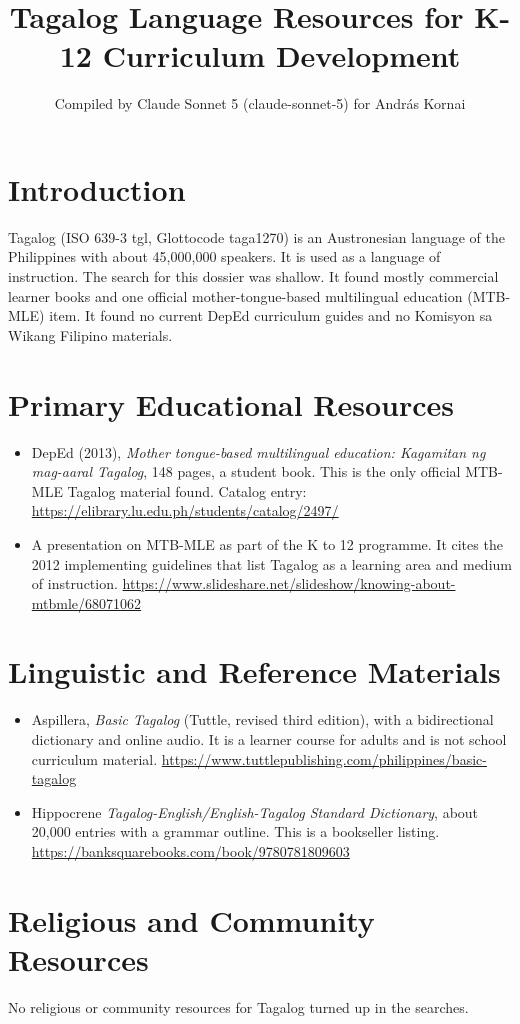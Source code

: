 \documentclass[12pt]{article}
\title{Tagalog Language Resources for K-12 Curriculum Development}
\author{Compiled by Claude Sonnet 5 (claude-sonnet-5) for Andr\'as Kornai}
\date{}
\begin{document}
\maketitle
\section{Introduction}
Tagalog (ISO 639-3 tgl, Glottocode taga1270) is an Austronesian language of the Philippines with about 45,000,000 speakers. It is used as a language of instruction. The search for this dossier was shallow. It found mostly commercial learner books and one official mother-tongue-based multilingual education (MTB-MLE) item. It found no current DepEd curriculum guides and no Komisyon sa Wikang Filipino materials.
\section{Primary Educational Resources}
\begin{itemize}
\item DepEd (2013), \emph{Mother tongue-based multilingual education: Kagamitan ng mag-aaral Tagalog}, 148 pages, a student book. This is the only official MTB-MLE Tagalog material found. Catalog entry: \url{https://elibrary.lu.edu.ph/students/catalog/2497/}
\item A presentation on MTB-MLE as part of the K to 12 programme. It cites the 2012 implementing guidelines that list Tagalog as a learning area and medium of instruction. \url{https://www.slideshare.net/slideshow/knowing-about-mtbmle/68071062}
\end{itemize}
\section{Linguistic and Reference Materials}
\begin{itemize}
\item Aspillera, \emph{Basic Tagalog} (Tuttle, revised third edition), with a bidirectional dictionary and online audio. It is a learner course for adults and is not school curriculum material. \url{https://www.tuttlepublishing.com/philippines/basic-tagalog}
\item Hippocrene \emph{Tagalog-English/English-Tagalog Standard Dictionary}, about 20,000 entries with a grammar outline. This is a bookseller listing. \url{https://banksquarebooks.com/book/9780781809603}
\end{itemize}
\section{Religious and Community Resources}
No religious or community resources for Tagalog turned up in the searches.
\end{document}
